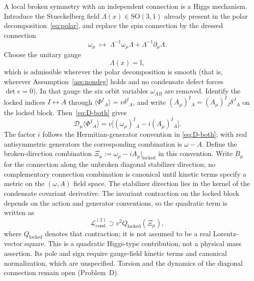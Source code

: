 A local broken symmetry with an independent connection is a Higgs
mechanism. Introduce the Stueckelberg field
\(\Lambda(x)\in\mathrm{SO}(3,1)\) already present in the polar
decomposition~\eqref{eq:polar}, and replace the spin connection by
the dressed connection
\begin{equation}
  \label{eq:dressed-omega}
  \omega_\mu
  \;\longmapsto\;
  \Lambda^{-1}\omega_\mu\Lambda+\Lambda^{-1}\partial_\mu\Lambda.
\end{equation}
Choose the unitary gauge
\begin{equation}
  \label{eq:unitary}
  \Lambda(x)=\mathbb{I},
\end{equation}
which is admissible wherever the polar decomposition is smooth
(that is, wherever Assumption~\ref{ass:nondeg} holds and no
condensate defect forces \(\det e=0\)). In that gauge the six orbit variables \(\omega_{AB}\) are removed.
Identify the locked indices \(I\leftrightarrow A\) through
\(\langle\Phi^I{}_A\rangle=v\delta^I{}_A\), and write
\((A_\mu)^I{}_A=(A_\mu)^I{}_J\delta^J{}_A\) on the locked block.
Then~\eqref{eq:D-both} gives
\[
  \mathcal D_\mu\langle\Phi^I{}_A\rangle
  =v\bigl[(\omega_\mu)^I{}_A-i(A_\mu)^I{}_A\bigr].
\]
The factor \(i\) follows the Hermitian-generator convention in
\eqref{eq:D-both}; with real antisymmetric generators the corresponding
combination is \(\omega-A\). Define the broken-direction combination
\(\Xi_\mu:=\omega_\mu-iA_\mu|_{\mathrm{locked}}\) in this convention.
Write \(B_\mu\) for the connection along the unbroken diagonal
stabilizer direction; no complementary connection combination is
canonical until kinetic terms specify a metric on the
\((\omega,A)\) field space. The stabilizer direction lies in the
kernel of the condensate covariant derivative. The invariant
contraction on the locked block depends on the action and generator
conventions, so the quadratic term is written as
\begin{equation}
  \label{eq:omega-mass}
  \mathcal L_{\mathrm{cond}}^{(2)}
  \supset v^2 Q_{\mathrm{locked}}(\Xi_\mu),
\end{equation}
where \(Q_{\mathrm{locked}}\) denotes that contraction; it is not
assumed to be a real Lorentz-vector square. This is a quadratic
Higgs-type contribution, not a physical mass assertion. Its pole and
sign require gauge-field kinetic terms and canonical normalization,
which are unspecified. Torsion and the dynamics of the diagonal
connection remain open (Problem~D).


